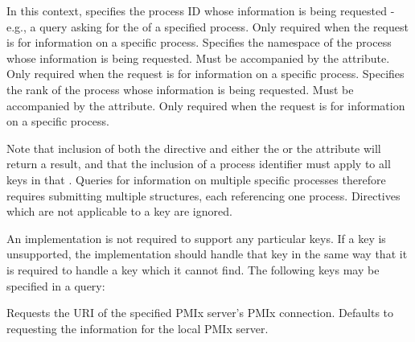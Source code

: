 In this context, specifies the process ID whose information is being requested - e.g., a query asking for the  of a specified process. Only required when the request is for information on a specific process.
\pasteAttributeItemEnd
{}Specifies the namespace of the process whose information is being requested. Must be accompanied by the  attribute. Only required when the request is for information on a specific process.
\pasteAttributeItemEnd
{}Specifies the rank of the process whose information is being requested. Must be accompanied by the  attribute. Only required when the request is for information on a specific process.
\pasteAttributeItemEnd
{}

Note that inclusion of both the  directive and either the  or the  attribute will return a  result, and that the inclusion of a process identifier must apply to all keys in that . Queries for information on multiple specific processes therefore requires submitting multiple  structures, each referencing one process.  Directives which are not applicable to a key are ignored.

\reqattrend

An implementation is not required to support any particular keys.  If a key is unsupported, the implementation should handle that key in the same way that it is required to handle a key which it cannot find.
The following keys may be specified in a query:

 Requests the URI of the specified \ac{PMIx} server's \ac{PMIx} connection. Defaults to requesting the information for the local \ac{PMIx} server.
\pasteAttributeItemEnd
{}

